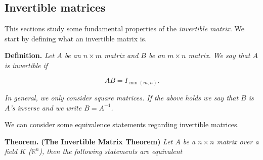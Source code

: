 \documentclass[
]{article}
\begin{document}
\hypertarget{invertible-matrices}{%
\subsection{Invertible matrices}\label{invertible-matrices}}

This sections study some fundamental properties of the \emph{invertible
matrix}. We start by defining what an invertible matrix is.

\textbf{Definition.} \emph{Let \(A\) be an \(n\times m\) matrix and
\(B\) be an \(m\times n\) matrix. We say that \(A\) is invertible if}

\[
AB=I_{\min(m,n)}.
\]

\emph{In general, we only consider square matrices. If the above holds
we say that \(B\) is \(A\)'s inverse and we write \(B=A^{-1}\).}

We can consider some equivalence statements regarding invertible
matrices.

\textbf{Theorem.} \textbf{(The Invertible Matrix Theorem)} \emph{Let
\(A\) be a \(n\times n\) matrix over a field \(K\) (\(\mathbb{R}^n\)),
then the following statements are equivalent}
\end{document}
